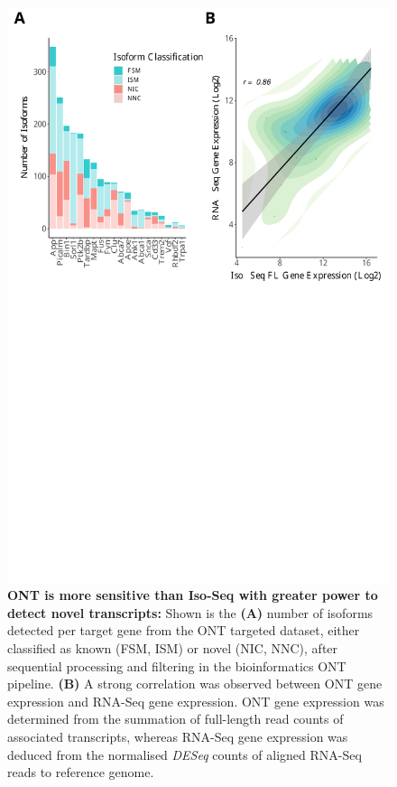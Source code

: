 \begin{figure}[!htp]
	\begin{center}
		\includegraphics[page=2,trim={0 19cm 0 0cm},clip,scale = 0.60]{Figures/ONTvsIsoSeq.pdf}
	\end{center}
	\captionsetup{width=0.95\textwidth}
	\caption[ONT is more sensitive than Iso-Seq with greater power to detect novel transcripts]%
	{\textbf{ONT is more sensitive than Iso-Seq with greater power to detect novel transcripts:} Shown is the \textbf{(A)} number of isoforms detected per target gene from the ONT targeted dataset, either classified as known (FSM, ISM) or novel (NIC, NNC), after sequential processing and filtering in the bioinformatics ONT pipeline. \textbf{(B)} A strong correlation was observed between ONT gene expression and RNA-Seq gene expression. ONT gene expression was determined from the summation of full-length read counts of associated transcripts, whereas RNA-Seq gene expression was deduced from the normalised \textit{DESeq} counts of aligned RNA-Seq reads to reference genome\cite{Castanho2020}.}
	\label{fig:ont_targeted_finalnumberiso}
\end{figure}

